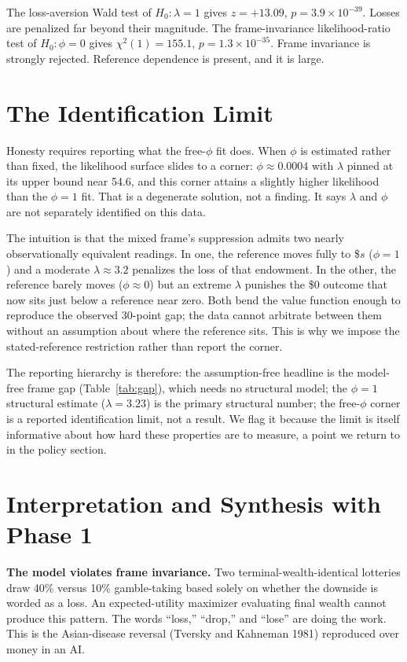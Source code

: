 \documentclass[11pt]{article}
\begin{document}
The loss-aversion Wald test of $H_0: \lambda = 1$ gives $z = +13.09$, $p = 3.9\times10^{-39}$. Losses are
penalized far beyond their magnitude. The frame-invariance likelihood-ratio test of $H_0: \phi = 0$
gives $\chi^2(1) = 155.1$, $p = 1.3\times10^{-35}$. Frame invariance is strongly rejected. Reference
dependence is present, and it is large.

\section{The Identification Limit}

Honesty requires reporting what the free-$\phi$ fit does. When $\phi$ is estimated rather than fixed, the
likelihood surface slides to a corner: $\phi \approx 0.0004$ with $\lambda$ pinned at its upper bound
near 54.6, and this corner attains a slightly higher likelihood than the $\phi = 1$ fit. That is a
degenerate solution, not a finding. It says $\lambda$ and $\phi$ are not separately identified on this
data.

The intuition is that the mixed frame's suppression admits two nearly observationally equivalent
readings. In one, the reference moves fully to \$$s$ ($\phi = 1$) and a moderate $\lambda \approx 3.2$
penalizes the loss of that endowment. In the other, the reference barely moves ($\phi \approx 0$) but an
extreme $\lambda$ punishes the \$0 outcome that now sits just below a reference near zero. Both bend the
value function enough to reproduce the observed 30-point gap; the data cannot arbitrate between them
without an assumption about where the reference sits. This is why we impose the stated-reference
restriction rather than report the corner.

The reporting hierarchy is therefore: the assumption-free headline is the model-free frame gap
(Table~\ref{tab:gap}), which needs no structural model; the $\phi = 1$ structural estimate
($\lambda = 3.23$) is the primary structural number; the free-$\phi$ corner is a reported identification
limit, not a result. We flag it because the limit is itself informative about how hard these properties
are to measure, a point we return to in the policy section.

\section{Interpretation and Synthesis with Phase 1}

\textbf{The model violates frame invariance.} Two terminal-wealth-identical lotteries draw 40\% versus
10\% gamble-taking based solely on whether the downside is worded as a loss. An expected-utility
maximizer evaluating final wealth cannot produce this pattern. The words ``loss,'' ``drop,'' and ``lose''
are doing the work. This is the Asian-disease reversal (Tversky and Kahneman 1981) reproduced over money
in an AI.
\end{document}
